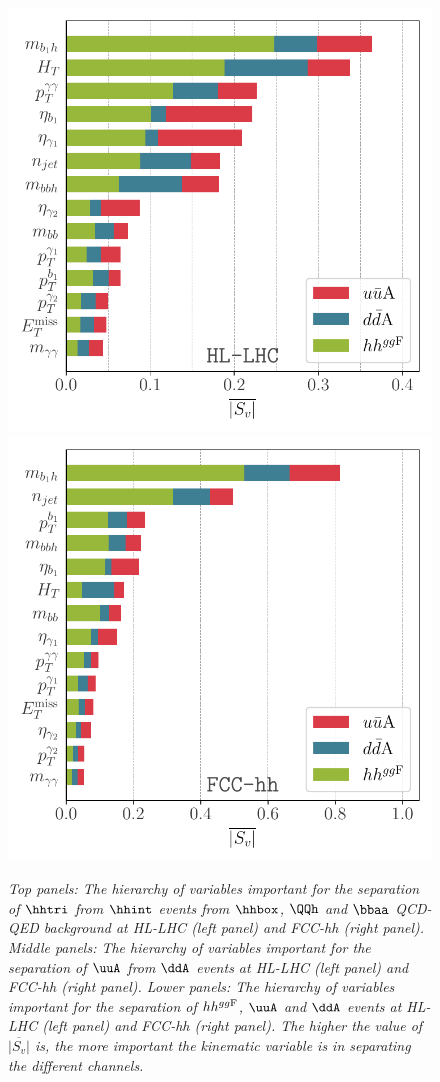 \begin{figure}[t!]
	\includegraphics[width=0.45\linewidth]{fig/HL-LHC-shap-ku-kd-hhsm.pdf}
	\includegraphics[width=0.45\linewidth]{fig/FCC-hh-shap-ku-kd-hhsm.pdf}
	\caption{\it Top panels: The hierarchy of variables important for the separation of $\hhtri$ from $\hhint$ events from $\hhbox$, $\QQh$ and $\bbaa$ QCD-QED background at HL-LHC (left panel) and FCC-hh (right panel). Middle panels: The hierarchy of variables important for the separation of $\uuA$ from $\ddA$ events at HL-LHC (left panel) and FCC-hh (right panel). Lower panels: The hierarchy of variables important for the separation of $hh^{gg\rm F}$, $\uuA$ and $\ddA$ events at HL-LHC (left panel) and FCC-hh (right panel). The higher the value of $\overline{|S_v|}$ is, the more important the kinematic variable is in separating the different channels.}
	\label{fig:shap}
\end{figure}
\FloatBarrier

